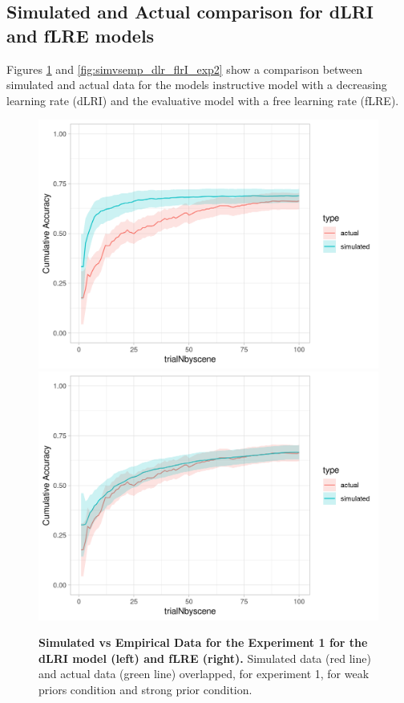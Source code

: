 \documentclass[a4paper,12pt]{article}
\begin{document}
\subsection*{Simulated and Actual comparison for dLRI and fLRE models}
Figures \ref{fig:simvsemp_dlr_flrI_exp1} and \ref{fig:simvsemp_dlr_flrI_exp2} show a comparison between simulated and actual data for the models instructive model with a decreasing learning rate (dLRI) and the evaluative model with a free learning rate (fLRE).

 

\begin{figure}[ht!]
{\includegraphics{figures/SimulatedVsActual.exp=exp1.mod=dLR_Instr.png}}\vfill
{\includegraphics{figures/SimulatedVsActual.exp=exp1.mod=fLR_Eval.png}}
\caption{\textbf{Simulated vs Empirical Data for the Experiment 1 for the dLRI model (left) and fLRE (right).} Simulated data (red line) and actual data (green line) overlapped, for experiment 1, for weak priors condition and strong prior condition. }
\label{fig:simvsemp_dlr_flrI_exp1}
\end{figure}
\end{document}
